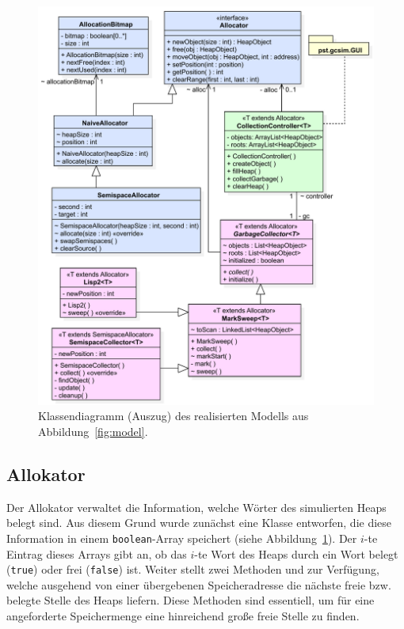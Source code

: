 \begin{figure}[h]
	\centering
	\includegraphics[scale=0.6]{img/uml/ch7-klassen.pdf}
	\caption[Klassendiagramm des realisierten Modells (Auszug)]{Klassendiagramm (Auszug) des realisierten Modells aus Abbildung~\ref{fig:model}.}
	\label{fig:implementation}
\end{figure}

\subsection{Allokator}
\label{sub:allocator}
Der Allokator verwaltet die Information, welche Wörter des simulierten Heaps belegt sind.
Aus diesem Grund wurde zunächst eine Klasse  entworfen, die diese Information in einem \texttt{boolean}-Array speichert (siehe Abbildung~\ref{fig:implementation}).
Der $i$-te Eintrag dieses Arrays gibt an, ob das $i$-te Wort des Heaps durch ein Wort belegt (\texttt{true}) oder frei (\texttt{false}) ist.
Weiter stellt  zwei Methoden  und  zur Verfügung, welche ausgehend von einer übergebenen Speicheradresse die nächste freie bzw. belegte Stelle des Heaps liefern.
Diese Methoden sind essentiell, um für eine angeforderte Speichermenge eine hinreichend große freie Stelle zu finden.

